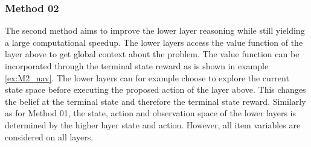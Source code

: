 \subsubsection{Method 02}\label{subsec:M2}
The second method aims to improve the lower layer reasoning while still yielding a large computational speedup. The lower layers access the value function of the layer above to get global context about the problem. The value function can be incorporated through the terminal state reward as is shown in example \ref{ex:M2_nav}. The lower layers can for example choose to explore the current state space before executing the proposed action of the layer above. This changes the belief at the terminal state and therefore the terminal state reward. Similarly as for Method 01, the state, action and observation space of the lower layers is determined by the higher layer state and action. However, all item variables are considered on all layers.

